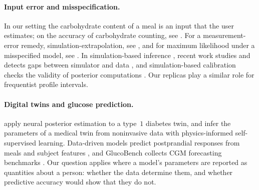 \paragraph{Input error and misspecification.}
In our setting the carbohydrate content of a meal is an input that the user estimates; on the accuracy of carbohydrate counting, see \citet{brazeau2013carbohydrate}.
For a measurement-error remedy, simulation-extrapolation, see \citet{cook1994simulation}, and for maximum likelihood under a misspecified model, see \citet{white1982maximum}.
In simulation-based inference \citep{greenberg2019automatic,tejerocantero2020sbi}, recent work studies and detects gaps between simulator and data \citep{ward2022robust,schmitt2023detecting}, and simulation-based calibration checks the validity of posterior computations \citep{talts2018sbc}.
Our replicas play a similar role for frequentist profile intervals.

\paragraph{Digital twins and glucose prediction.}
\citet{hoang2025t1dsbi} apply neural posterior estimation to a type~$1$ diabetes twin, and \citet{kuang2024medreal2sim} infer the parameters of a medical twin from noninvasive data with physics-informed self-supervised learning.
Data-driven models predict postprandial responses from meals and subject features \citep{zeevi2015personalized,berry2020human}, and GlucoBench collects CGM forecasting benchmarks \citep{sergazinov2024glucobench}.
Our question applies where a model's parameters are reported as quantities about a person: whether the data determine them, and whether predictive accuracy would show that they do not.

